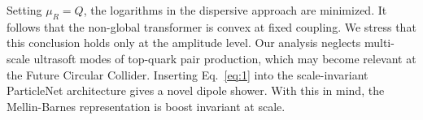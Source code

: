 Setting $\mu_R = Q$, the logarithms in the dispersive approach are
minimized. It follows that the non-global transformer is convex at fixed
coupling. We stress that this conclusion holds only at the amplitude
level. Our analysis neglects multi-scale ultrasoft modes of top-quark
pair production, which may become relevant at the Future Circular
Collider. Inserting Eq.~\eqref{eq:1} into the scale-invariant
ParticleNet architecture gives a novel dipole shower. With this in mind,
the Mellin-Barnes representation is boost invariant at scale.


